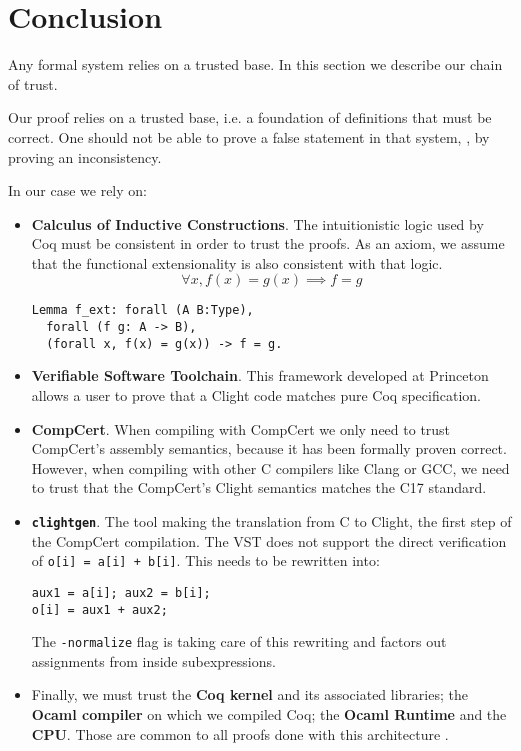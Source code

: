 \section{Conclusion}
\label{sec:Conclusion}

Any formal system relies on a trusted base. In this section we describe our
chain of trust.

Our proof relies on a trusted base, i.e. a foundation of definitions that must be
correct. One should not be able to prove a false statement in that system, \eg, by
proving an inconsistency.

In our case we rely on:
\begin{itemize}
  \item \textbf{Calculus of Inductive Constructions}. The intuitionistic logic
  used by Coq must be consistent in order to trust the proofs. As an axiom,
  we assume that the functional extensionality is also consistent with that logic.
  $$\forall x, f(x) = g(x) \implies f = g$$
\begin{lstlisting}[language=Coq,belowskip=-0.25 \baselineskip]
Lemma f_ext: forall (A B:Type),
  forall (f g: A -> B),
  (forall x, f(x) = g(x)) -> f = g.
\end{lstlisting}

  \item \textbf{Verifiable Software Toolchain}. This framework developed at
  Princeton allows a user to prove that a Clight code matches pure Coq
  specification.

  \item \textbf{CompCert}. When compiling with CompCert we only need to trust
  CompCert's {assembly} semantics, because it has been formally proven correct.
  However, when compiling with other C compilers like Clang or GCC, we need to
  trust that the CompCert's Clight semantics matches the C17 standard.

  \item \textbf{\texttt{clightgen}}. The tool making the translation from {C} to
  {Clight}, the first step of the CompCert compilation.
  The VST does not support the direct verification of \texttt{o[i] = a[i] + b[i]}.
  This needs to be rewritten into:
  \begin{lstlisting}[language=Ctweetnacl,stepnumber=0,belowskip=-0.5 \baselineskip]
aux1 = a[i]; aux2 = b[i];
o[i] = aux1 + aux2;
\end{lstlisting}
  The \texttt{-normalize} flag is taking care of this
  rewriting and factors out assignments from inside subexpressions.

  \item Finally, we must trust the \textbf{Coq kernel} and its
  associated libraries; the \textbf{Ocaml compiler} on which we compiled Coq;
  the \textbf{Ocaml Runtime} and the \textbf{CPU}. Those are common to all proofs
  done with this architecture \cite{2015-Appel,coq-faq}.
\end{itemize}

